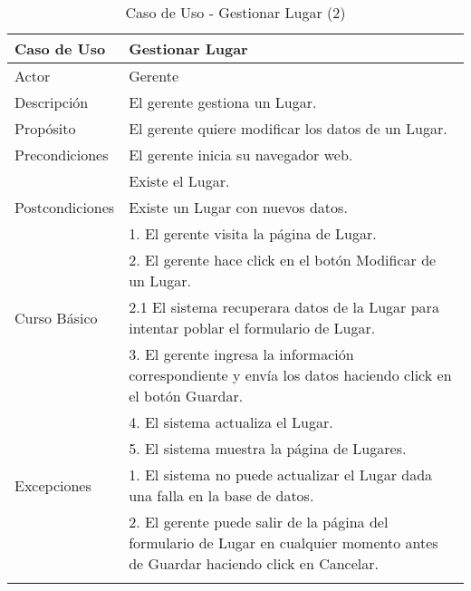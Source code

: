 \begin{longtable}{@{} p{3cm} p{10cm} @{}} \toprule
    \textbf{Caso de Uso}    & Gestionar Lugar \\ \midrule
    Actor                   & Gerente \\ \cmidrule{1-2}
    Descripción             & El gerente gestiona un Lugar. \\ \cmidrule{1-2}
    Propósito               & El gerente quiere modificar los datos de un Lugar. \\ \cmidrule{1-2}
    Precondiciones          & El gerente inicia su navegador web. \\
                            & Existe el Lugar. \\ \cmidrule{1-2} 
    Postcondiciones         & Existe un Lugar con nuevos datos. \\ \cmidrule{1-2} 
                            & 1. El gerente visita la página de Lugar. \\ 
                            & 2. El gerente hace click en el botón Modificar de un Lugar. \\
   Curso Básico             & 2.1 El sistema recuperara datos de la Lugar para intentar poblar el formulario de Lugar. \\
                            & 3. El gerente ingresa la información correspondiente y envía los datos haciendo click en el botón Guardar. \\
                            & 4. El sistema actualiza el Lugar. \\ 
                            & 5. El sistema muestra la página de Lugares. \\ \cmidrule{1-2}
    Excepciones             & 1. El sistema no puede actualizar el Lugar dada una falla en la base de datos. \\
                            & 2. El gerente puede salir de la página del formulario de Lugar en cualquier momento antes de Guardar haciendo click en Cancelar. \\ \bottomrule
   \caption{Caso de Uso - Gestionar Lugar (2)} \label{tab:tabcu-lug2} \\
   \end{longtable}



